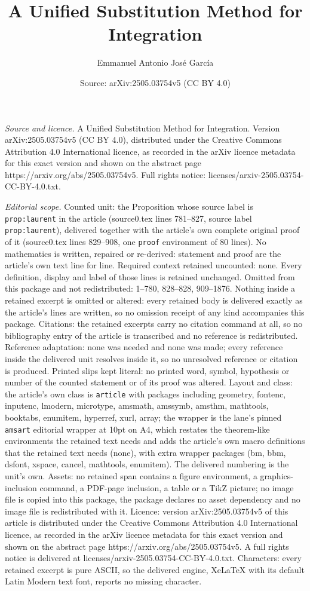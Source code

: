 \documentclass[10pt,a4paper]{amsart}
\title[A Unified Substitution Method for Integration]{A Unified Substitution Method for Integration}
\author{Emmanuel Antonio Jos\'e Garc\'ia}
\date{Source: arXiv:2505.03754v5 (CC BY 4.0)}
\begin{document}
\maketitle

\noindent\emph{Source and licence.} A Unified Substitution Method for Integration. Version arXiv:2505.03754v5 (CC BY 4.0), distributed under the Creative Commons Attribution 4.0 International licence, as recorded in the arXiv licence metadata for this exact version and shown on the abstract page https://arxiv.org/abs/2505.03754v5. Full rights notice: licenses/arxiv-2505.03754-CC-BY-4.0.txt.\par\smallskip

\noindent\textit{Editorial scope.} Counted unit: the Proposition whose source label is \texttt{prop:laurent} in the article (source0.tex lines 781--827, source label \texttt{prop:laurent}), delivered together with the article's own complete original proof of it (source0.tex lines 829--908, one \texttt{proof} environment of 80 lines). No mathematics is written, repaired or re-derived: statement and proof are the article's own text line for line. Required context retained uncounted: none. Every definition, display and label of those lines is retained unchanged. Omitted from this package and not redistributed: 1--780, 828--828, 909--1876. Nothing inside a retained excerpt is omitted or altered: every retained body is delivered exactly as the article's lines are written, so no omission receipt of any kind accompanies this package. Citations: the retained excerpts carry no citation command at all, so no bibliography entry of the article is transcribed and no reference is redistributed. Reference adaptation: none was needed and none was made; every reference inside the delivered unit resolves inside it, so no unresolved reference or citation is produced. Printed slips kept literal: no printed word, symbol, hypothesis or number of the counted statement or of its proof was altered. Layout and class: the article's own class is \texttt{article} with packages including geometry, fontenc, inputenc, lmodern, microtype, amsmath, amssymb, amsthm, mathtools, booktabs, enumitem, hyperref, xurl, array; the wrapper is the lane's pinned \texttt{amsart} editorial wrapper at 10pt on A4, which restates the theorem-like environments the retained text needs and adds the article's own macro definitions that the retained text needs (none), with extra wrapper packages (bm, bbm, dsfont, xspace, cancel, mathtools, enumitem). The delivered numbering is the unit's own. Assets: no retained span contains a figure environment, a graphics-inclusion command, a PDF-page inclusion, a table or a TikZ picture; no image file is copied into this package, the package declares no asset dependency and no image file is redistributed with it. Licence: version arXiv:2505.03754v5 of this article is distributed under the Creative Commons Attribution 4.0 International licence, as recorded in the arXiv licence metadata for this exact version and shown on the abstract page https://arxiv.org/abs/2505.03754v5. A full rights notice is delivered at licenses/arxiv-2505.03754-CC-BY-4.0.txt. Characters: every retained excerpt is pure ASCII, so the delivered engine, XeLaTeX with its default Latin Modern text font, reports no missing character.
\end{document}
